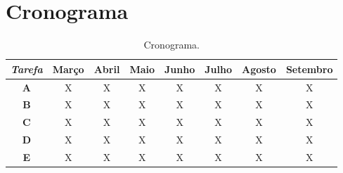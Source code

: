 \section{Cronograma}

\begin{table}
\begin{center}
\begin{small}
\begin{tabular}{|c|c|c|c|c|c|c|c|} 
\hline
\emph{Tarefa} &
Março & 
Abril & 
Maio &  
Junho & 
Julho &
Agosto & 
Setembro \\ \hline
\textbf{A} & X & X & X & X & X & X & X \\ \hline 
\textbf{B} & X & X & X & X & X & X & X \\ \hline 
\textbf{C} & X & X & X & X & X & X & X \\ \hline 
\textbf{D} & X & X & X & X & X & X & X \\ \hline 
\textbf{E} & X & X & X & X & X & X & X \\ \hline 
\end{tabular}
\caption{Cronograma.}
\label{tab:tab:F5}
\end{small}
\end{center}
\end{table}